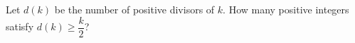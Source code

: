 Let $d(k)$ be the number of positive divisors of $k$. How many positive integers satisfy $d(k)\ge\dfrac{k}{2}$?
